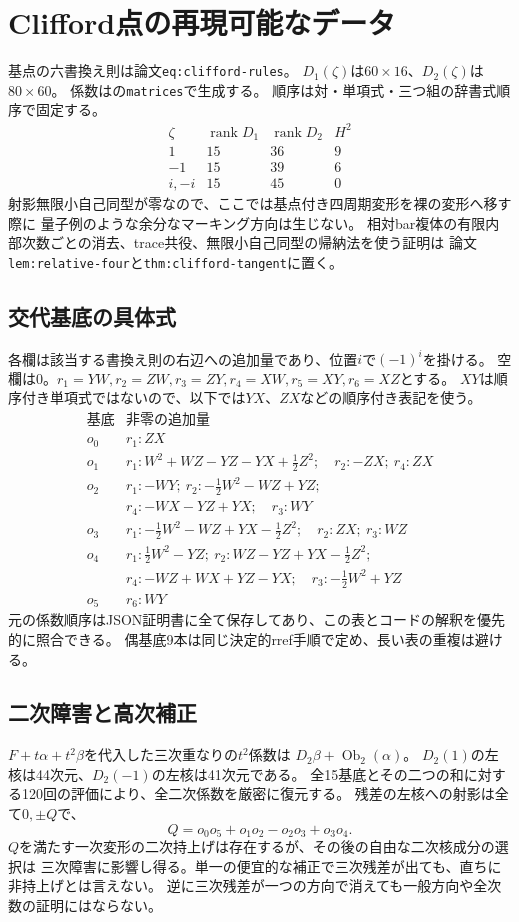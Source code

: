 \documentclass[11pt,a4paper]{ltjsarticle}
\begin{document}
\section{Clifford点の再現可能なデータ}
基点の六書換え則は論文\texttt{eq:clifford-rules}。
$D_1(\zeta)$は$60\times16$、$D_2(\zeta)$は$80\times60$。
係数はの\texttt{matrices}で生成する。
順序は対・単項式・三つ組の辞書式順序で固定する。
\[
\begin{array}{c|ccc}
\zeta&\operatorname{rank}D_1&\operatorname{rank}D_2&H^2\\\hline
1&15&36&9\\-1&15&39&6\\i,-i&15&45&0
\end{array}
\]
射影無限小自己同型が零なので、ここでは基点付き四周期変形を裸の変形へ移す際に
量子例のような余分なマーキング方向は生じない。
相対bar複体の有限内部次数ごとの消去、trace共役、無限小自己同型の帰納法を使う証明は
論文\texttt{lem:relative-four}と\texttt{thm:clifford-tangent}に置く。

\subsection*{交代基底の具体式}
各欄は該当する書換え則の右辺への追加量であり、位置$i$で$(-1)^i$を掛ける。
空欄は0。$r_1=YW,r_2=ZW,r_3=ZY,r_4=XW,r_5=XY,r_6=XZ$とする。
$XY$は順序付き単項式ではないので、以下では$YX$、$ZX$などの順序付き表記を使う。
\[
\begin{array}{c|l}
\text{基底}&\text{非零の追加量}\\\hline
 o_0&r_1:ZX\\[1mm]
 o_1&r_1:W^2+WZ-YZ-YX+\tfrac12Z^2;\quad r_2:-ZX;\ r_4:ZX\\[1mm]
 o_2&r_1:-WY;\ r_2:-\tfrac12W^2-WZ+YZ;\\
    &r_4:-WX-YZ+YX;\quad r_3:WY\\[1mm]
 o_3&r_1:-\tfrac12W^2-WZ+YX-\tfrac12Z^2;\quad r_2:ZX;\ r_3:WZ\\[1mm]
 o_4&r_1:\tfrac12W^2-YZ;\ r_2:WZ-YZ+YX-\tfrac12Z^2;\\
    &r_4:-WZ+WX+YZ-YX;\quad r_3:-\tfrac12W^2+YZ\\[1mm]
 o_5&r_6:WY
\end{array}
\]
元の係数順序はJSON証明書に全て保存してあり、この表とコードの解釈を優先的に照合できる。
偶基底9本は同じ決定的rref手順で定め、長い表の重複は避ける。

\subsection*{二次障害と高次補正}
$F+t\alpha+t^2\beta$を代入した三次重なりの$t^2$係数は
$D_2\beta+\operatorname{Ob}_2(\alpha)$。
$D_2(1)$の左核は44次元、$D_2(-1)$の左核は41次元である。
全15基底とその二つの和に対する120回の評価により、全二次係数を厳密に復元する。
残差の左核への射影は全て$0,\pm Q$で、
\[
 Q=o_0o_5+o_1o_2-o_2o_3+o_3o_4.
\]
$Q$を満たす一次変形の二次持上げは存在するが、その後の自由な二次核成分の選択は
三次障害に影響し得る。単一の便宜的な補正で三次残差が出ても、直ちに非持上げとは言えない。
逆に三次残差が一つの方向で消えても一般方向や全次数の証明にはならない。
\end{document}
